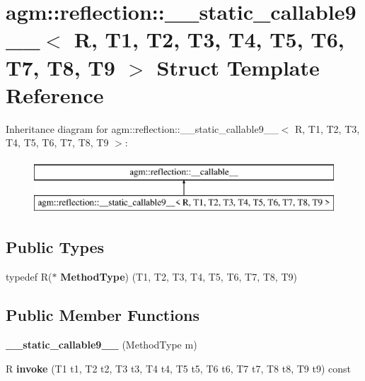 \hypertarget{structagm_1_1reflection_1_1____static__callable9____}{}\section{agm\+:\+:reflection\+:\+:\+\_\+\+\_\+static\+\_\+callable9\+\_\+\+\_\+$<$ R, T1, T2, T3, T4, T5, T6, T7, T8, T9 $>$ Struct Template Reference}
\label{structagm_1_1reflection_1_1____static__callable9____}
Inheritance diagram for agm\+:\+:reflection\+:\+:\+\_\+\+\_\+static\+\_\+callable9\+\_\+\+\_\+$<$ R, T1, T2, T3, T4, T5, T6, T7, T8, T9 $>$\+:\begin{figure}[H]
\begin{center}
\leavevmode
\includegraphics[height=2.000000cm]{structagm_1_1reflection_1_1____static__callable9____}
\end{center}
\end{figure}
\subsection*{Public Types}
\begin{DoxyCompactItemize}
\item 
typedef R($\ast$ {\bfseries Method\+Type}) (T1, T2, T3, T4, T5, T6, T7, T8, T9)\hypertarget{structagm_1_1reflection_1_1____static__callable9_____a83f646c3953bfcc2ef61ccb2abd1ca7c}{}\label{structagm_1_1reflection_1_1____static__callable9_____a83f646c3953bfcc2ef61ccb2abd1ca7c}

\end{DoxyCompactItemize}
\subsection*{Public Member Functions}
\begin{DoxyCompactItemize}
\item 
{\bfseries \+\_\+\+\_\+static\+\_\+callable9\+\_\+\+\_\+} (Method\+Type m)\hypertarget{structagm_1_1reflection_1_1____static__callable9_____a40e62a01e0bd7a997ce166fd5fa27397}{}\label{structagm_1_1reflection_1_1____static__callable9_____a40e62a01e0bd7a997ce166fd5fa27397}

\item 
R {\bfseries invoke} (T1 t1, T2 t2, T3 t3, T4 t4, T5 t5, T6 t6, T7 t7, T8 t8, T9 t9) const \hypertarget{structagm_1_1reflection_1_1____static__callable9_____aaf898af326f238eb2b527f810b4a7f4d}{}\label{structagm_1_1reflection_1_1____static__callable9_____aaf898af326f238eb2b527f810b4a7f4d}

\end{DoxyCompactItemize}
